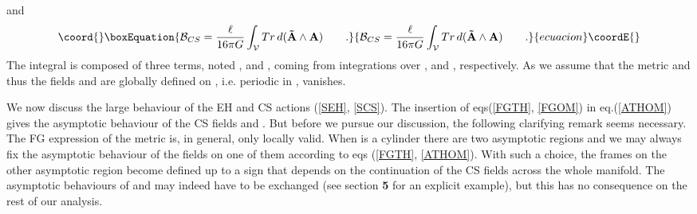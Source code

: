 \documentclass[a4paper,10pt]{article}
\begin{document}
and  
\begin{equation}\coord{}\boxEquation{ 
\label{BEHCS} 
{\cal B}_{CS}= 
\frac {\ell} {16 \pi G} 
\int_{\cal V} Tr \, d ( {\bf \tilde A}\wedge {\bf A}) \qquad . 
}{ 
{\cal B}_{CS}= 
\frac {\ell} {16 \pi G} 
\int_{\cal V} Tr \, d ( {\bf \tilde A}\wedge {\bf A}) \qquad . 
}{ecuacion}\coordE{}\end{equation} 
The integral \coordHE{} is composed of three terms, 
noted \coordHE{}, \coordHE{} and 
\coordHE{}, coming from integrations 
over \coordHE{}, \myHighlight{$\varphi$}\coordHE{} and \coordHE{}, respectively. As we assume that the  
metric and thus the fields \coordHE{} and \coordHE{} are  
globally defined on \coordHE{}, i.e. periodic in \myHighlight{$\varphi$}\coordHE{},  
\coordHE{} vanishes. 
 
We now discuss the large \coordHE{} behaviour of the EH and CS actions  
(\ref{SEH}, \ref{SCS}).  
The insertion of eqs(\ref{FGTH}, \ref{FGOM}) in eq.(\ref{ATHOM})  
gives the asymptotic behaviour of the CS fields  
\coordHE{} and \coordHE{}. But before we pursue our discussion, the following
clarifying remark seems necessary. The FG expression of the
metric is, in general, only locally valid. When  \myHighlight{$\Sigma $}\coordHE{} is a cylinder
there are two asymptotic regions and
we may always fix the asymptotic
behaviour of the fields on one of them according 
to eqs (\ref{FGTH}, \ref{ATHOM}). With such a
choice, the frames \coordHE{} on the other
asymptotic region become defined up to a sign 
that depends on the continuation
of the CS fields across the whole manifold. The 
asymptotic behaviours of
\coordHE{} and \coordHE{} may indeed 
have to be exchanged (see section {\bf 5} for an
explicit example), but this has no consequence 
on the rest of our analysis.
\end{document}
